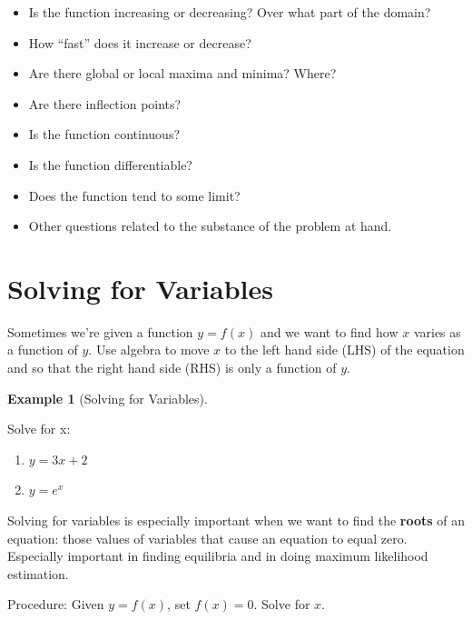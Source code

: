 \documentclass[
  letterpaper,
]{book}
\providecommand{\tightlist}{%
  \setlength{\itemsep}{0pt}\setlength{\parskip}{0pt}}\usepackage{longtable,booktabs,array}
\theoremstyle{definition}
\theoremstyle{definition}
\newtheorem{example}{Example}[chapter]
\theoremstyle{plain}
\theoremstyle{definition}
\theoremstyle{plain}
\theoremstyle{plain}
\theoremstyle{remark}
\begin{document}
\begin{itemize}
\tightlist
\item
  Is the function increasing or decreasing? Over what part of the
  domain?
\item
  How ``fast'' does it increase or decrease?
\item
  Are there global or local maxima and minima? Where?
\item
  Are there inflection points?
\item
  Is the function continuous?
\item
  Is the function differentiable?
\item
  Does the function tend to some limit?
\item
  Other questions related to the substance of the problem at hand.
\end{itemize}

\hypertarget{solving-for-variables}{%
\section*{Solving for Variables}\label{solving-for-variables}}

Sometimes we're given a function \(y=f(x)\) and we want to find how
\(x\) varies as a function of \(y\). Use algebra to move \(x\) to the
left hand side (LHS) of the equation and so that the right hand side
(RHS) is only a function of \(y\).

\leavevmode{}%
\begin{example}[Solving for Variables]\label{exm-solvevar}

Solve for x:

\begin{enumerate}
\def\labelenumi{\arabic{enumi}.}
\tightlist
\item
  \(y=3x+2\)
\item
  \(y=e^x\)
\end{enumerate}

\end{example}

Solving for variables is especially important when we want to find the
\textbf{roots} of an equation: those values of variables that cause an
equation to equal zero. Especially important in finding equilibria and
in doing maximum likelihood estimation.

Procedure: Given \(y=f(x)\), set \(f(x)=0\). Solve for \(x\).
\end{document}
